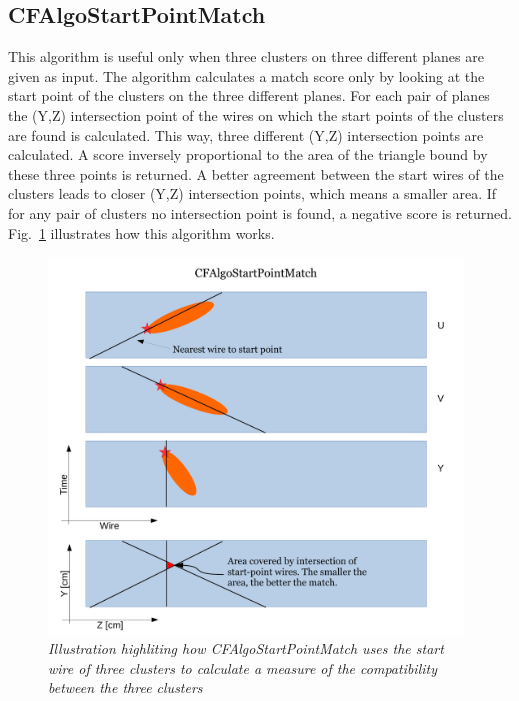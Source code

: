 \documentclass{article}
\begin{document}
\subsection{CFAlgoStartPointMatch}
This algorithm is useful only when three clusters on three different planes are given as input. The algorithm calculates a match score only by
looking at the start point of the clusters on the three different planes. For each pair of planes the (Y,Z) intersection point of the wires on 
which the start points of the clusters are found is calculated. This way, three different (Y,Z) intersection points are calculated. A score inversely
proportional to the area of the triangle bound by these three points is returned. A better agreement between the start wires of the clusters leads
to closer (Y,Z) intersection points, which means a smaller area. If for any pair of clusters no intersection point is found, a negative score is returned.
Fig.~\ref{fig:StartPointMatch} illustrates how this algorithm works.
\begin{figure}[!h]
\begin{center}
\includegraphics[width=110mm]{Figures/MatchAglo_CFAlgoStartPointMatch_Description.pdf}
\end{center}
\caption{\textit{Illustration highliting how CFAlgoStartPointMatch uses the start wire of three clusters to calculate a measure of the compatibility
between the three clusters}}
\label{fig:StartPointMatch}
\end{figure}

\newpage
\end{document}
